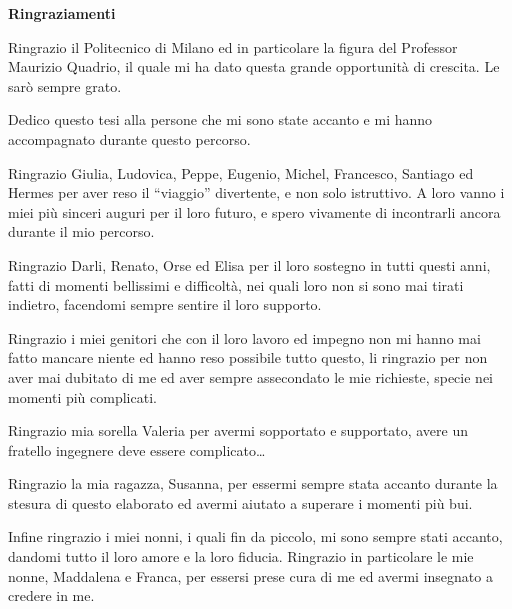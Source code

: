 \documentclass[a4paper,twosides,openright,titlepage]{book}
\newenvironment{abstract}%
	{\cleardoublepage%
		\thispagestyle{empty}%
		\null \vfill\begin{center}%
		\bfseries \abstractname \end{center}}%
	{\vfill\null}
\begin{document}
\renewcommand{\abstractname}{Ringraziamenti}
\begin{abstract}
\hrulefill

Ringrazio il Politecnico di Milano ed in particolare la figura del Professor Maurizio Quadrio, il quale mi ha dato questa grande opportunità di crescita. Le sarò sempre grato.\par
Dedico questo tesi alla persone che mi sono state accanto e mi hanno accompagnato durante questo percorso. \par
Ringrazio Giulia, Ludovica, Peppe, Eugenio, Michel, Francesco, Santiago ed Hermes per aver reso il ``viaggio'' divertente, e non solo istruttivo.
A loro vanno i miei più sinceri auguri per il loro futuro, e spero vivamente di incontrarli ancora durante il mio percorso.\par
Ringrazio Darli, Renato, Orse ed Elisa per il loro sostegno in tutti questi anni, fatti di momenti bellissimi e difficoltà, nei quali loro non si sono mai tirati indietro, facendomi sempre sentire il loro supporto.\par
Ringrazio i miei genitori che con il loro lavoro ed impegno non mi hanno mai fatto mancare niente ed hanno reso possibile tutto questo, li ringrazio per non aver mai dubitato di me ed aver sempre assecondato le mie richieste, specie nei momenti più complicati.\par
Ringrazio mia sorella Valeria per avermi sopportato e supportato, avere un fratello ingegnere deve essere complicato\dots \par
Ringrazio la mia ragazza, Susanna, per essermi sempre stata accanto durante la stesura di questo elaborato ed avermi aiutato a superare i momenti più bui.

Infine ringrazio i miei nonni, i quali fin da piccolo, mi sono sempre stati accanto, dandomi tutto il loro amore e la loro fiducia. Ringrazio in particolare le mie nonne, Maddalena e Franca, per essersi prese cura di me ed avermi insegnato a credere in me.\par
\hrulefill
\end{abstract}




\tableofcontents 



\mainmatter



%








%



\backmatter
{} 
\printbibliography
\end{document}
